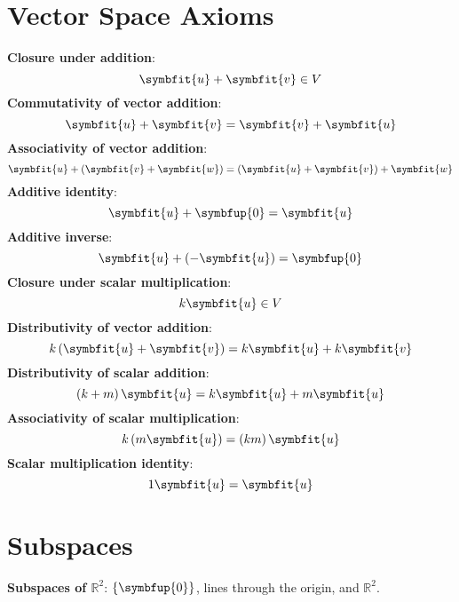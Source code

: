 \documentclass{article}
\begin{document}
\begin{multicols*}{2}
    \section*{Vector Space Axioms}
    \textbf{Closure under addition}:
    \begin{equation*}
        \symbfit{u}+\symbfit{v} \in V
    \end{equation*}
    \textbf{Commutativity of vector addition}:
    \begin{equation*}
        \symbfit{u} + \symbfit{v} = \symbfit{v} + \symbfit{u}
    \end{equation*}
    \textbf{Associativity of vector addition}:
    \begin{equation*}
        \symbfit{u} + \left(\symbfit{v} + \symbfit{w}\right) =
        \left(\symbfit{u} + \symbfit{v}\right) + \symbfit{w}
    \end{equation*}
    \textbf{Additive identity}:
    \begin{equation*}
        \symbfit{u} + \symbfup{0} = \symbfit{u}
    \end{equation*}
    \textbf{Additive inverse}:
    \begin{equation*}
        \symbfit{u} + \left(-\symbfit{u}\right) = \symbfup{0}
    \end{equation*}
    \textbf{Closure under scalar multiplication}:
    \begin{equation*}
        k\symbfit{u} \in V
    \end{equation*}
    \textbf{Distributivity of vector addition}:
    \begin{equation*}
        k \left(\symbfit{u} + \symbfit{v}\right) = k\symbfit{u} + k\symbfit{v}
    \end{equation*}
    \textbf{Distributivity of scalar addition}:
    \begin{equation*}
        \left(k+m\right)\symbfit{u} = k\symbfit{u} + m\symbfit{u}
    \end{equation*}
    \textbf{Associativity of scalar multiplication}:
    \begin{equation*}
        k\left(m\symbfit{u}\right)=\left(km\right)\symbfit{u}
    \end{equation*}
    \textbf{Scalar multiplication identity}:
    \begin{equation*}
        1 \symbfit{u}=\symbfit{u}
    \end{equation*}
    \section*{Subspaces}
    \textbf{Subspaces of $\mathbb{R}^2$}: $\left\{ \symbfup{0} \right\}$,
    lines through the origin, and $\mathbb{R}^2$.


\end{multicols*}
\end{document}
